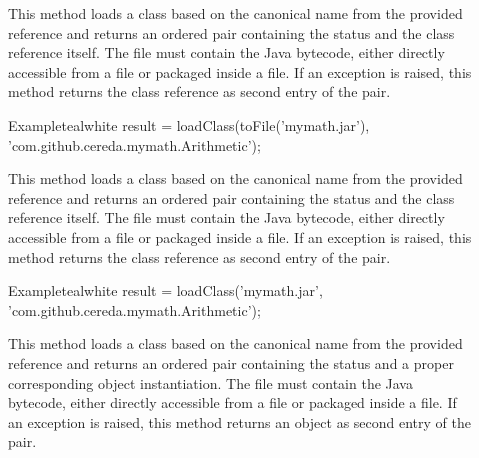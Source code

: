 \begin{description}
\item[] This method loads a class based on the canonical name from the provided  reference and returns an ordered pair containing the status and the class reference itself. The file must contain the Java bytecode, either directly accessible from a  file or packaged inside a  file. If an exception is raised, this method returns the  class reference as second entry of the pair.

\begin{codebox}{Example}{teal}{\icnote}{white}
result = loadClass(toFile('mymath.jar'),
         'com.github.cereda.mymath.Arithmetic');
\end{codebox}

\item[] This method loads a class based on the canonical name from the provided  reference and returns an ordered pair containing the status and the class reference itself. The file must contain the Java bytecode, either directly accessible from a  file or packaged inside a  file.  If an exception is raised, this method returns the  class reference as second entry of the pair.

\begin{codebox}{Example}{teal}{\icnote}{white}
result = loadClass('mymath.jar',
         'com.github.cereda.mymath.Arithmetic');
\end{codebox}

\item[] This method loads a class based on the canonical name from the provided  reference and returns an ordered pair containing the status and a proper corresponding object instantiation. The file must contain the Java bytecode, either directly accessible from a  file or packaged inside a  file. If an exception is raised, this method returns an  object as second entry of the pair.


\end{description}
